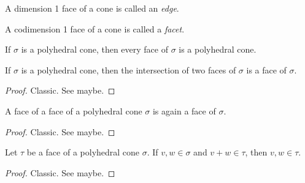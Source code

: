 \begin{definition}
  \label{1-2-5-edge}

  A dimension 1 face of a cone is called an \emph{edge}.
\end{definition}


\begin{definition}
  \label{1-2-5-facet}

  A codimension 1 face of a cone is called a \emph{facet}.
\end{definition}


\begin{lemma}
  \label{1-2-6-face-polyhedral-cone}

  If $\sigma$ is a polyhedral cone, then every face of $\sigma$ is a polyhedral cone.
\end{lemma}


\begin{lemma}
  \label{1-2-6-inter-faces}

  If $\sigma$ is a polyhedral cone, then the intersection of two faces of $\sigma$ is a face of $\sigma$.
\end{lemma}
\begin{proof}

  Classic. See \cite{Oda_1988} maybe.
\end{proof}


\begin{lemma}
  \label{1-2-6-face-face}

  A face of a face of a polyhedral cone $\sigma$ is again a face of $\sigma$.
\end{lemma}
\begin{proof}

  Classic. See \cite{Oda_1988} maybe.
\end{proof}


\begin{lemma}
  \label{1-2-7-face-mem-of-add}

  Let $\tau$ be a face of a polyhedral cone $\sigma$. If $v, w \in \sigma$ and $v + w \in \tau$, then $v, w \in \tau$.
\end{lemma}
\begin{proof}

  Classic. See \cite{Oda_1988} maybe.
\end{proof}


